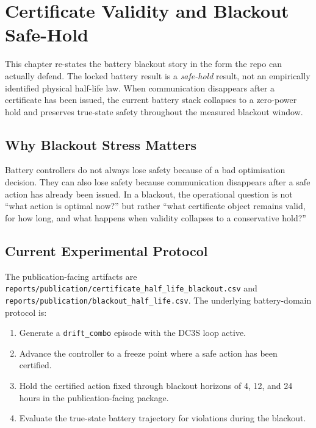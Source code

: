\chapter{Certificate Validity and Blackout Safe-Hold}
\label{ch:cert-half-life-blackout}

This chapter re-states the battery blackout story in the form the repo can
actually defend.  The locked battery result is a \emph{safe-hold} result,
not an empirically identified physical half-life law.  When communication
disappears after a certificate has been issued, the current battery stack
collapses to a zero-power hold and preserves true-state safety throughout the
measured blackout window.

\section{Why Blackout Stress Matters}

Battery controllers do not always lose safety because of a bad optimisation
decision.  They can also lose safety because communication disappears after a
safe action has already been issued.  In a blackout, the operational question
is not ``what action is optimal now?'' but rather ``what certificate object
remains valid, for how long, and what happens when validity collapses to a
conservative hold?''

\section{Current Experimental Protocol}

The publication-facing artifacts are
\texttt{reports/publication/certificate\_half\_life\_blackout.csv} and
\texttt{reports/publication/blackout\_half\_life.csv}.  The underlying
battery-domain protocol is:

\begin{enumerate}
  \item Generate a \texttt{drift\_combo} episode with the DC3S loop active.
  \item Advance the controller to a freeze point where a safe action has been
    certified.
  \item Hold the certified action fixed through blackout horizons of
    4, 12, and 24 hours in the publication-facing package.
  \item Evaluate the true-state battery trajectory for violations during the
    blackout.
\end{enumerate}

